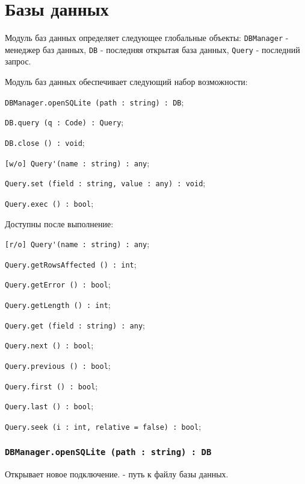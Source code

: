 \section{Базы данных}

Модуль баз данных определяет следующее глобальные объекты: \lstinline|DBManager| - менеджер баз данных, \lstinline|DB| - последняя открытая база данных, \lstinline|Query| - последний запрос.

Модуль баз данных обеспечивает следующий набор возможности:
\begin{icItems}
    \item \lstinline|DBManager.openSQLite (path : string) : DB|;
	\item \lstinline|DB.query (q : Code) : Query|;
	\item \lstinline|DB.close () : void|;
	\item \lstinline|[w/o] Query'(name : string) : any|;
	\item \lstinline|Query.set (field : string, value : any) : void|;
	\item \lstinline|Query.exec () : bool|;
	\item Доступны после выполнение:
	\begin{icItems}
	    \item \lstinline|[r/o] Query'(name : string) : any|;
		\item \lstinline|Query.getRowsAffected () : int|;
		\item \lstinline|Query.getError () : bool|;
		\item \lstinline|Query.getLength () : int|;
		\item \lstinline|Query.get (field : string) : any|;
		\item \lstinline|Query.next () : bool|;
		\item \lstinline|Query.previous () : bool|;
		\item \lstinline|Query.first () : bool|;
		\item \lstinline|Query.last () : bool|;
		\item \lstinline|Query.seek (i : int, relative = false) : bool|;
	\end{icItems}
\end{icItems}

\subsubsection{\lstinline|DBManager.openSQLite (path : string) : DB|}

Открывает новое подключение.  - путь к файлу базы данных.

